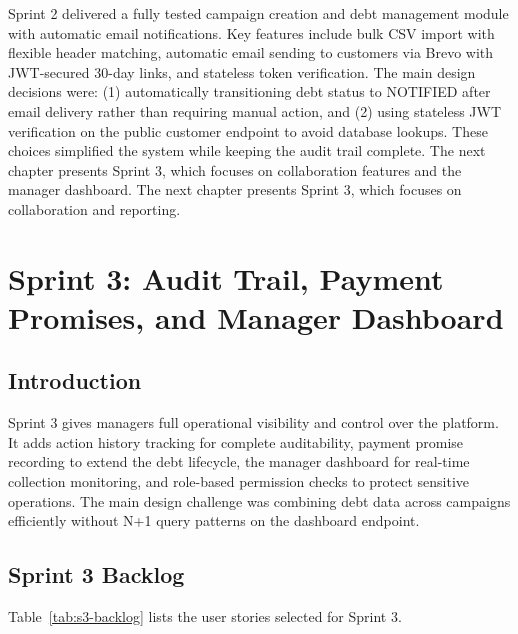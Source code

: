 \documentclass[12pt,a4paper]{report}
\begin{document}
Sprint 2 delivered a fully tested campaign creation and debt management module with automatic email notifications.
Key features include bulk CSV import with flexible header matching, automatic email sending to customers via Brevo with JWT-secured 30-day links, and stateless token verification.
The main design decisions were: (1) automatically transitioning debt status to NOTIFIED after email delivery rather than requiring manual action, and (2) using stateless JWT verification on the public customer endpoint to avoid database lookups.
These choices simplified the system while keeping the audit trail complete.
The next chapter presents Sprint 3, which focuses on collaboration features and the manager dashboard.
The next chapter presents Sprint 3, which focuses on collaboration and reporting.

\chapter{Sprint 3: Audit Trail, Payment Promises, and Manager Dashboard}
\label{chap:sprint3}

\section*{Introduction}
{}

Sprint 3 gives managers full operational visibility and control over the platform.
It adds action history tracking for complete auditability, payment promise recording
to extend the debt lifecycle, the manager dashboard for real-time collection
monitoring, and role-based permission checks to protect sensitive operations.
The main design challenge was combining debt data across campaigns efficiently
without N+1 query patterns on the dashboard endpoint.

\section{Sprint 3 Backlog}

Table~\ref{tab:s3-backlog} lists the user stories selected for Sprint 3.
\end{document}
